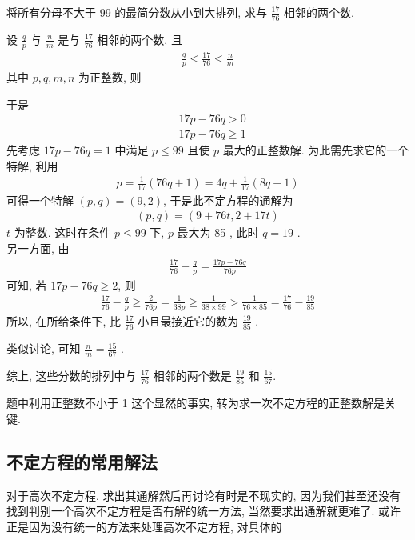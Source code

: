 \begin{example}
	将所有分母不大于 99 的最简分数从小到大排列, 求与 $\frac{17}{76}$ 相邻的两个数.
\end{example}
\begin{solution}
	设 $\frac{q}{p}$ 与 $\frac{n}{m}$ 是与 $\frac{17}{76}$ 相邻的两个数, 且
	\begin{align*}
		\frac{q}{p}<\frac{17}{76}<\frac{n}{m}
	\end{align*}
	其中 $p ,  q ,  m ,  n$ 为正整数, 则

	于是\begin{align}
		 & 17 p-76 q>0           \\
		 & 17 p-76 q \geqslant 1
	\end{align}
	先考虑 $17 p-76 q=1$ 中满足 $p \leqslant 99$ 且使 $p$ 最大的正整数解. 为此需先求它的一个特解, 利用
	\begin{align*}
		p=\frac{1}{17}(76 q+1)=4 q+\frac{1}{17}(8 q+1)
	\end{align*}
	可得一个特解 $(p, q)=(9,2)$, 于是此不定方程的通解为
	\begin{align*}
		(p, q)=(9+76 t, 2+17 t)
	\end{align*}
	$t$ 为整数. 这时在条件 $p \leqslant 99$ 下, $p$ 最大为 85 , 此时 $q=19$ . \\
	另一方面, 由
	\begin{align*}
		\frac{17}{76}-\frac{q}{p}=\frac{17 p-76 q}{76 p}
	\end{align*}
	可知, 若 $17 p-76 q \geqslant 2$, 则
	\begin{align*}
		\frac{17}{76}-\frac{q}{p} \geqslant \frac{2}{76 p}=\frac{1}{38 p} \geqslant \frac{1}{38 \times 99}>\frac{1}{76 \times 85}=\frac{17}{76}-\frac{19}{85}
	\end{align*}
	所以, 在所给条件下, 比 $\frac{17}{76}$ 小且最接近它的数为 $\frac{19}{85}$ .

	类似讨论, 可知 $\frac{n}{m}=\frac{15}{67}$ .

	综上, 这些分数的排列中与 $\frac{17}{76}$ 相邻的两个数是 $\frac{19}{85}$ 和 $\frac{15}{67}$.
\end{solution}
\begin{note}
	题中利用正整数不小于 1 这个显然的事实, 转为求一次不定方程的正整数解是关键.
\end{note}

\subsection{不定方程的常用解法}
对于高次不定方程, 求出其通解然后再讨论有时是不现实的, 因为我们甚至还没有找到判别一个高次不定方程是否有解的统一方法, 当然要求出通解就更难了. 或许正是因为没有统一的方法来处理高次不定方程, 对具体的

